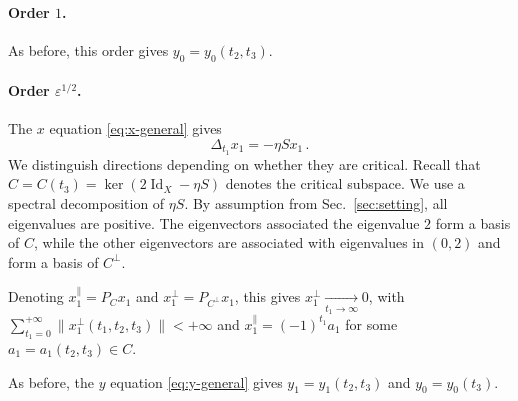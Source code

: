 \documentclass[11pt,english,reqno]{article}
\DeclareMathOperator{\Id}{Id}
\theoremstyle{plain}
\theoremstyle{definition}
\theoremstyle{remark}
\numberwithin{equation}{section}
\begin{document}
    \paragraph{Order $1$.} As before, this order gives $y_0 = y_0(t_2, t_3)$.

    \paragraph{Order $\varepsilon^{1/2}$.} The $x$ equation \eqref{eq:x-general} gives
    \begin{equation*}
        \Delta_{t_1} x_1 = - \eta S x_1 \, .
    \end{equation*}
    We distinguish directions depending on whether they are critical. Recall that $C = C(t_3) = \ker(2 \Id_X - \eta S)$ denotes the critical subspace. We use a spectral decomposition of $\eta S$. By assumption from Sec.~\ref{sec:setting}, all eigenvalues are positive. The eigenvectors associated the eigenvalue $2$ form a basis of $C$, while the other eigenvectors are associated with eigenvalues in $(0,2)$ and form a basis of $C^\perp$. 
    
    Denoting $x_1^\parallel = P_C x_1$ and $x_1^\perp = P_{C^\perp} x_1$, this gives $x_1^\perp \xrightarrow[t_1 \to \infty]{} 0$, with $\sum_{t_1=0}^{+\infty} \|x_1^\perp(t_1, t_2, t_3)\| < +\infty$ and $x_1^\parallel = (-1)^{t_1} a_1$ for some $a_1 = a_1(t_2, t_3) \in C$.

    As before, the $y$ equation \eqref{eq:y-general} gives $y_1 = y_1(t_2, t_3)$ and $y_0 = y_0(t_3)$.
\end{document}
